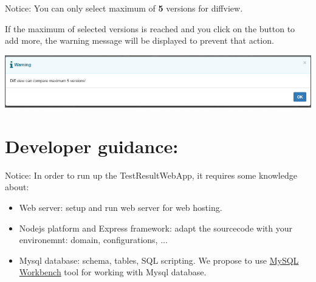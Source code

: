 \begin{boxhint}{Notice:}
   You can only select maximum of \textbf{5} versions for diffview.

   If the maximum of selected versions is reached and you click on the button to 
   add more, the warning message will be displayed to prevent that action.
\end{boxhint}

\includegraphics[width=1\linewidth]{./pictures/diffview/warning.png}

\hypertarget{developer-guidance}{%
\section{Developer guidance:}\label{developer-guidance}}

\begin{boxhint}{Notice:}
In order to run up the TestResultWebApp, it requires some knowledge about:
\begin{itemize}
   \item Web server: setup and run web server for web hosting.
   \item Nodejs platform and Express framework: adapt the sourcecode with your
         environemnt: domain, configurations, ...
   \item Mysql database: schema, tables, SQL scripting. We propose to use 
         \href{https://dev.mysql.com/doc/workbench/en/}{MySQL Workbench} tool
         for working with Mysql database.
\end{itemize}
\end{boxhint}

